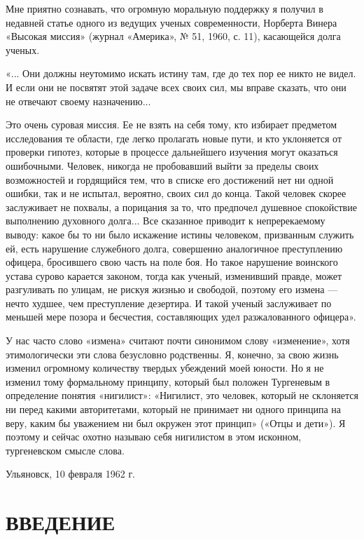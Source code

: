 Мне приятно сознавать, что огромную моральную поддержку я получил в
недавней статье одного из ведущих ученых современности, Норберта
Винера «Высокая миссия» (журнал «Америка», № 51, 1960, с. 11),
касающейся долга ученых.

«... Они должны неутомимо искать истину там, где до тех пор ее никто
не видел. И если они не посвятят этой задаче всех своих сил, мы вправе
сказать, что они не отвечают своему назначению...

Это очень суровая миссия. Ее не взять на себя тому, кто избирает
предметом исследования те области, где легко пролагать новые пути, и
кто уклоняется от проверки гипотез, которые в процессе дальнейшего
изучения могут оказаться ошибочными. Человек, никогда не пробовавший
выйти за пределы своих возможностей и гордящийся тем, что в списке его
достижений нет ни одной ошибки, так и не испытал, вероятно, своих сил
до конца. Такой человек скорее заслуживает не похвалы, а порицания за
то, что предпочел душевное спокойствие выполнению духовного долга...
Все сказанное приводит к непререкаемому выводу: какое бы то ни было
искажение истины человеком, призванным служить ей, есть нарушение
служебного долга, совершенно аналогичное преступлению офицера,
бросившего свою часть на поле боя. Но такое нарушение воинского устава
сурово карается законом, тогда как ученый, изменивший правде, может
разгуливать по улицам, не рискуя жизнью и свободой, поэтому его измена
--- нечто худшее, чем преступление дезертира. И такой ученый
заслуживает по меньшей мере позора и бесчестия, составляющих удел
разжалованного офицера».

У нас часто слово «измена» считают почти синонимом слову «изменение»,
хотя этимологически эти слова безусловно родственны. Я, конечно, за
свою жизнь изменил огромному количеству твердых убеждений моей юности.
Но я не изменил тому формальному принципу, который был положен
Тургеневым в определение понятия «нигилист»: «Нигилист, это человек,
который не склоняется ни перед какими авторитетами, который не
принимает ни одного принципа на веру, каким бы уважением ни был
окружен этот принцип» («Отцы и дети»). Я поэтому и сейчас охотно
называю себя нигилистом в этом исконном, тургеневском смысле слова.

\begin{flushright} Ульяновск, 10 февраля 1962 г. \end{flushright}

\clearpage


\section{ВВЕДЕНИЕ}


